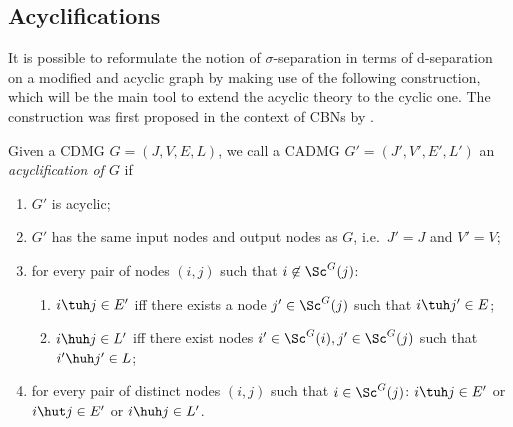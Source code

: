 \subsection{Acyclifications}\label{sec:graph_acyclifications}

It is possible to reformulate the notion of $\sigma$-separation in terms of d-separation on a modified and acyclic graph
by making use of the following construction, which will be the main tool to extend the acyclic theory to the cyclic one.
The construction was first proposed in the context of CBNs by \cite{Spirtes94,Spirtes95}.
\begin{Def}\label{def:cdg_acyclification}
    Given a CDMG $G = ( J, V, E, L)$, we call a CADMG $G' = (J', V', E', L')$
  an \emph{acyclification of $G$} if
  \begin{enumerate}[label=(\roman*)]
    \item $G'$ is acyclic;
    \item $G'$ has the same input nodes and output nodes as $G$, i.e.\ $J'=J$ and $V'=V$;
    \item for every pair of nodes $(i,j)$ such that $i \not\in\Sc^G(j)$:
      \begin{enumerate}
      \item $i \tuh j \in E'$ iff there exists a node $j' \in \Sc^G(j)$ such that $i \tuh j' \in E$;
      \item $i \huh j \in L'$ iff there exist nodes $i' \in \Sc^G(i), j' \in \Sc^G(j)$ such that $i' \huh j' \in L$;
      \end{enumerate}\label{def:acyclification_inter_scc}
  \item for every pair of distinct nodes $(i,j)$ such that $i \in\Sc^G(j)$: $i \tuh j \in E'$ or $i \hut j \in E'$ or $i \huh j \in L'$.\label{def:acyclification_intra_scc}
  \end{enumerate}
\end{Def}

